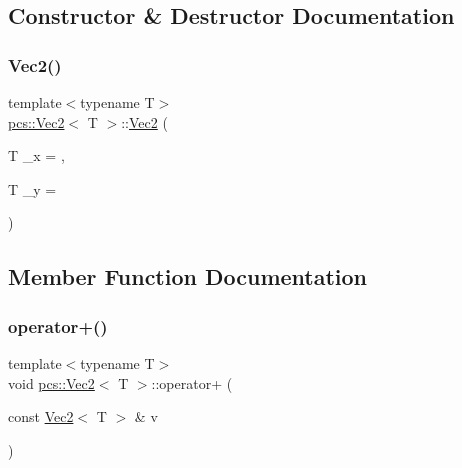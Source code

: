 \subsection{Constructor \& Destructor Documentation}
\mbox{\label{structpcs_1_1Vec2_ad4062fa4dce3e5a6789060114a27571d}} 
\subsubsection{\texorpdfstring{Vec2()}{Vec2()}}
{\footnotesize\ttfamily template$<$typename T$>$ \\
\hyperlink{structpcs_1_1Vec2}{pcs\+::\+Vec2}$<$ T $>$\+::\hyperlink{structpcs_1_1Vec2}{Vec2} (\begin{DoxyParamCaption}\item[{T}]{\+\_\+x = {},  }\item[{T}]{\+\_\+y = {} }\end{DoxyParamCaption})\hspace{0.3cm}{\ttfamily [inline]}}



\subsection{Member Function Documentation}
\mbox{\label{structpcs_1_1Vec2_a58965c0a64fad2c35fa628dc0ec3b671}} 
\subsubsection{\texorpdfstring{operator+()}{operator+()}}
{\footnotesize\ttfamily template$<$typename T$>$ \\
void \hyperlink{structpcs_1_1Vec2}{pcs\+::\+Vec2}$<$ T $>$\+::operator+ (\begin{DoxyParamCaption}\item[{const \hyperlink{structpcs_1_1Vec2}{Vec2}$<$ T $>$ \&}]{v }\end{DoxyParamCaption})\hspace{0.3cm}{\ttfamily [inline]}}

\mbox{\label{structpcs_1_1Vec2_a1fb1ccb1a4a54b4529e5cfd7d79ed48d}} 
